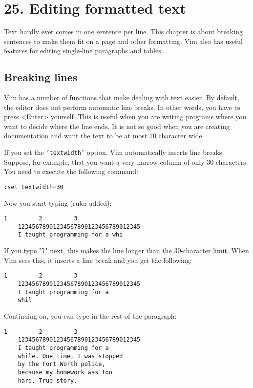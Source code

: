 \section{25. Editing formatted text}
Text hardly ever comes in one sentence per line.
This chapter is about breaking sentences to make them fit on a page and other formatting.
Vim also has useful features for editing single-line paragraphs and tables.
\subsection{Breaking lines}
Vim has a number of functions that make dealing with text easier.
By default, the editor does not perform automatic line breaks.
In other words, you have to press <Enter> yourself.
This is useful when you are writing programs where you want to decide where the line ends.
It is not so good when you are creating documentation and want the text to be at most 70 character wide.

If you set the \texttt{'textwidth'} option, Vim automatically inserts line breaks.
Suppose, for example, that you want a very narrow column of only 30 characters.
You need to execute the following command:

\begin{Verbatim}[samepage=true]
 :set textwidth=30
\end{Verbatim}

Now you start typing (ruler added):

\begin{Verbatim}[samepage=true]
             1         2         3
    12345678901234567890123456789012345
    I taught programming for a whi 
\end{Verbatim}

If you type "\texttt{l}" next, this makes the line longer than the 30-character limit.
When Vim sees this, it inserts a line break and you get the following:

\begin{Verbatim}[samepage=true]
             1         2         3
    12345678901234567890123456789012345
    I taught programming for a 
    whil 
\end{Verbatim}

Continuing on, you can type in the rest of the paragraph:

\begin{Verbatim}[samepage=true]
             1         2         3
    12345678901234567890123456789012345
    I taught programming for a 
    while. One time, I was stopped 
    by the Fort Worth police, 
    because my homework was too 
    hard. True story. 
\end{Verbatim}

